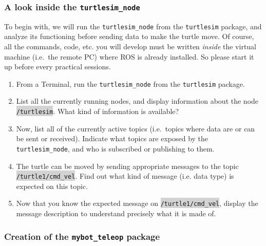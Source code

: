 \documentclass[10pt,a4paper,printanswers]{upmc}
\newcounter{mainmemorder}
\newcommand{\save}{\setcounter{mainmemorder}{\value{enumi}}}
\newcommand{\mytext}[1]{\colorbox{lightgray}{\texttt{#1}}}
\begin{document}
\subsubsection{A look inside the \texttt{turtlesim\_node}} To begin with, we will run the
\texttt{turtlesim\_node} from the \texttt{turtlesim} package, and analyze its functioning before
sending data to make the turtle move. Of course, all the commands, code, etc. you will develop must
be written \emph{inside} the virtual machine (i.e.\ the remote PC) where ROS is already installed.
So please start it up before every practical sessions.

\begin{enumerate}
  \item From a Terminal, run the \texttt{turtlesim\_node} from the \texttt{turtlesim} package.
  \item List all the currently running nodes, and display information about the node
        \mytext{/turtlesim}. What kind of information is available?
  \item Now, list all of the currently active topics (i.e.\ topics where data are or can be sent or
        received). Indicate what topics are exposed by the \texttt{turtlesim\_node}, and who is
        subscribed or publishing to them.
  \item The turtle can be moved by sending appropriate messages to the topic
        \mytext{/turtle1/cmd\_vel}. Find out what kind of message (i.e. data type) is expected on
        this topic.
  \item Now that you know the expected message on \mytext{/turtle1/cmd\_vel}, display the message
        description to understand precisely what it is made of.
        \save
\end{enumerate}

\subsubsection{Creation of the \texttt{mybot\_teleop} package}
\end{document}
